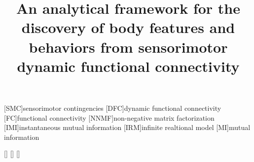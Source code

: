 \usepackage{afterpage}
\usepackage{algorithm}
\usepackage[]{algpseudocode}

\usepackage{stix}
\usepackage{amsmath}


\usepackage{arydshln}
\usepackage[english]{babel}
\usepackage{bm}
\usepackage{caption}
\usepackage[T1]{fontenc}
\usepackage[]{graphicx}
\graphicspath{ {./fig/} }

\usepackage[utf8]{inputenc}
\usepackage{marginnote}
\usepackage{multicol}
\usepackage{xcolor}
\usepackage{soul}
\usepackage{subfig}
\usepackage{tikz}
\usepackage{url}
\usepackage[backend=biber,style=ieee,sorting=none]{biblatex}



\newcommand{\trsp}{{^{\top}}}

\newcommand\blankpage{%
    \null
    \thispagestyle{empty}%
    \addtocounter{page}{-1}%
    \newpage}

\newcommand*\circled[1]{\tikz[baseline=(char.base)]{
            \node[shape=circle,draw,inner sep=2pt] (char) {#1};}}

\newcommand*{\important}[1]{\textcolor{red}{\danger~\textbf{IMPORTANT:~}} \textcolor{red}{#1}}

\newcommand*{\pending}[1]{\textcolor{blue}{$\bigstar$~\textbf{PENDING~#1}}}

\newcommand\mybox[2][]{\tikz[overlay]\node[fill=blue!100,inner sep=4pt, anchor=text, rectangle, rounded corners=1mm,#1] {#2};\phantom{#2}}

\newcommand{\TODO}{\mybox[fill=yellow]{\textcolor{blue}{\Large \textbf{TODO}}}}
\newcommand\myhl[1]{\textcolor{red}{#1}}


\newtheorem{prop}{Proposition}

\usepackage[nolist]{acronym}
[SMC]{sensorimotor contingencies}
[DFC]{dynamic functional connectivity}
[FC]{functional connectivity}
[NNMF]{non-negative matrix factorization}
[IMI]{instantaneous mutual information}
[IRM]{infinite realtional model}
[MI]{mutual information}

\newacro{}[]{}
\newacro{}[]{}
\newacro{}[]{}

\title{\LARGE \bf
An analytical framework for the discovery of body features and behaviors from sensorimotor dynamic functional connectivity
}


